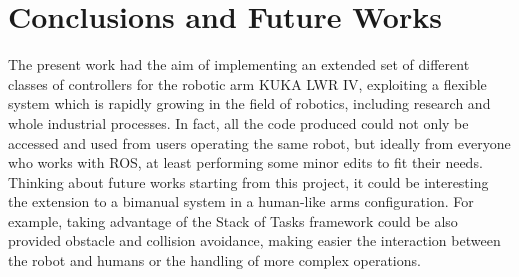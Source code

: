 \section{Conclusions and Future Works}
The present work had the aim of implementing an extended set of different classes of controllers for the robotic arm KUKA LWR IV, exploiting a flexible system which is rapidly growing in the field of robotics, including research and whole industrial processes. In fact, all the code produced could not only be accessed and used from users operating the same robot, but ideally from everyone who works with ROS, at least performing some minor edits to fit their needs. Thinking about future works starting from this project, it could be interesting the extension to a bimanual system in a human-like arms configuration. For example, taking advantage of the Stack of Tasks framework could be also provided obstacle and collision avoidance, making easier the interaction between the robot and humans or the handling of more complex operations. 
\newpage